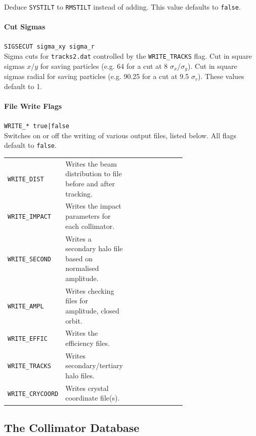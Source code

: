 Deduce \texttt{SYSTILT} to \texttt{RMSTILT} instead of adding.
This value defaults to \texttt{false}.

\paragraph{Cut Sigmas} \texttt{SIGSECUT sigma\_xy sigma\_r}\\

Sigma cuts for \texttt{tracks2.dat} controlled by the \texttt{WRITE\_TRACKS} flag.
Cut in square sigmas $x$/$y$ for saving particles (e.g. 64 for a cut at 8 $\sigma_x$/$\sigma_y$).
Cut in square sigmas radial for saving particles (e.g. 90.25 for a cut at 9.5 $\sigma_r$).
These values default to 1.

\paragraph{File Write Flags} \texttt{WRITE\_* true|false}\\

Switches on or off the writing of various output files, listed below.
All flags default to \texttt{false}.

\bigskip
\begin{tabular}{@{}llp{0.7\linewidth}}
    \texttt{WRITE\_DIST}     & Writes the beam distribution to file before and after tracking. \\
    \texttt{WRITE\_IMPACT}   & Writes the impact parameters for each collimator. \\
    \texttt{WRITE\_SECOND}   & Writes a secondary halo file based on normalised amplitude. \\
    \texttt{WRITE\_AMPL}     & Writes checking files for amplitude, closed orbit. \\
    \texttt{WRITE\_EFFIC}    & Writes the efficiency files. \\
    \texttt{WRITE\_TRACKS}   & Writes secondary/tertiary halo files. \\
    \texttt{WRITE\_CRYCOORD} & Writes crystal coordinate file(s).
\end{tabular}


\subsection{The Collimator Database}\label{Sec:CollDB}

